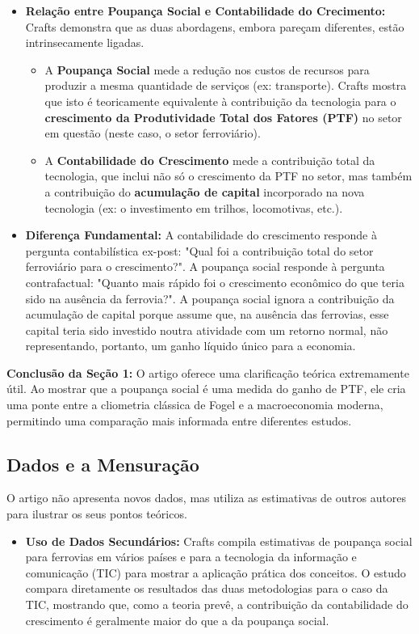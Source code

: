 \documentclass[12pt, a4paper]{article}
\begin{document}
\begin{itemize}
    \item \textbf{Relação entre Poupança Social e Contabilidade do Crecimento:} Crafts demonstra que as duas abordagens, embora pareçam diferentes, estão intrinsecamente ligadas.
        \begin{itemize}
            \item A \textbf{Poupança Social} mede a redução nos custos de recursos para produzir a mesma quantidade de serviços (ex: transporte). Crafts mostra que isto é teoricamente equivalente à contribuição da tecnologia para o \textbf{crescimento da Produtividade Total dos Fatores (PTF)} no setor em questão (neste caso, o setor ferroviário).
            \item A \textbf{Contabilidade do Crescimento} mede a contribuição total da tecnologia, que inclui não só o crescimento da PTF no setor, mas também a contribuição do \textbf{acumulação de capital} incorporado na nova tecnologia (ex: o investimento em trilhos, locomotivas, etc.).
        \end{itemize}
    \item \textbf{Diferença Fundamental:} A contabilidade do crescimento responde à pergunta contabilística ex-post: "Qual foi a contribuição total do setor ferroviário para o crescimento?". A poupança social responde à pergunta contrafactual: "Quanto mais rápido foi o crescimento econômico do que teria sido na ausência da ferrovia?". A poupança social ignora a contribuição da acumulação de capital porque assume que, na ausência das ferrovias, esse capital teria sido investido noutra atividade com um retorno normal, não representando, portanto, um ganho líquido único para a economia.
\end{itemize}

\noindent\textbf{Conclusão da Seção 1:} O artigo oferece uma clarificação teórica extremamente útil. Ao mostrar que a poupança social é uma medida do ganho de PTF, ele cria uma ponte entre a cliometria clássica de Fogel e a macroeconomia moderna, permitindo uma comparação mais informada entre diferentes estudos.

\subsection{Dados e a Mensuração}
O artigo não apresenta novos dados, mas utiliza as estimativas de outros autores para ilustrar os seus pontos teóricos.
\begin{itemize}
    \item \textbf{Uso de Dados Secundários:} Crafts compila estimativas de poupança social para ferrovias em vários países e para a tecnologia da informação e comunicação (TIC) para mostrar a aplicação prática dos conceitos. O estudo compara diretamente os resultados das duas metodologias para o caso da TIC, mostrando que, como a teoria prevê, a contribuição da contabilidade do crescimento é geralmente maior do que a da poupança social.
\end{itemize}
\end{document}

